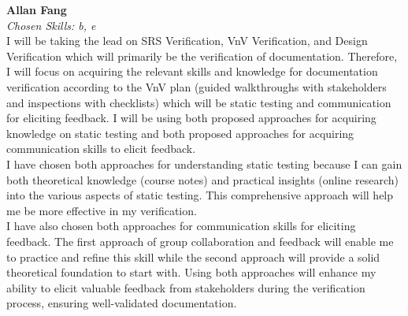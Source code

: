 \documentclass[12pt, titlepage]{article}
\begin{document}
\begin{enumerate}
  \medskip
  \textbf{Allan Fang}\\
  \textit{Chosen Skills: b, e } \\
  I will be taking the lead on SRS Verification, VnV Verification, and Design Verification which will primarily be the verification of documentation. Therefore, I will focus on acquiring the relevant skills and knowledge for documentation verification according to the VnV plan (guided walkthroughs with stakeholders and inspections with checklists) which will be static testing and communication for eliciting feedback. I will be using both proposed approaches for acquiring knowledge on static testing and both proposed approaches for acquiring communication skills to elicit feedback. \\
  I have chosen both approaches for understanding static testing because I can gain both theoretical knowledge (course notes) and practical insights (online research) into the various aspects of static testing. This comprehensive approach will help me be more effective in my verification.\\
  I have also chosen both approaches for communication skills for eliciting feedback. The first approach of group collaboration and feedback will enable me to practice and refine this skill while the second approach will provide a solid theoretical foundation to start with. Using both approaches will enhance my ability to elicit valuable feedback from stakeholders during the verification process, ensuring well-validated documentation.

  
\end{enumerate}
\end{document}
